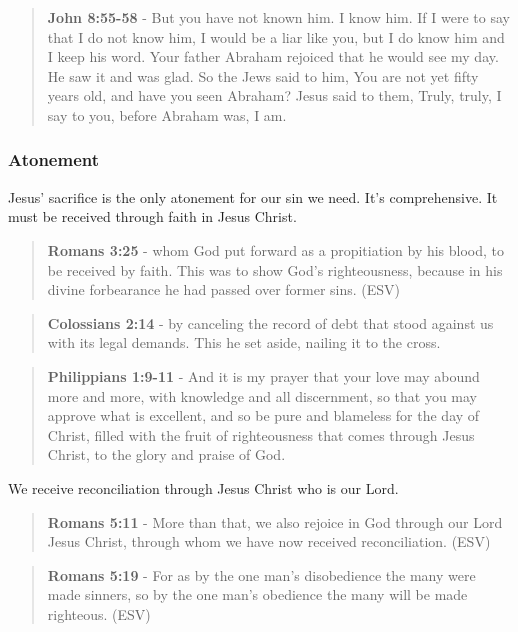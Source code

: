 \documentclass[11pt]{article}
\begin{document}
\begin{quote}
\textbf{John 8:55-58} - But you have not known him. I know him. If I were to say that I do not know him, I would be a liar like you, but I do know him and I keep his word. Your father Abraham rejoiced that he would see my day. He saw it and was glad. So the Jews said to him, You are not yet fifty years old, and have you seen Abraham? Jesus said to them, Truly, truly, I say to you, before Abraham was, I am.
\end{quote}

\subsubsection{Atonement}
\label{sec:orged750e9}
Jesus' sacrifice is the only atonement for our sin we need. It's comprehensive.
It must be received through faith in Jesus Christ.

\begin{quote}
\textbf{Romans 3:25} -  whom God put forward as a propitiation by his blood, to be received by faith.  This was to show God's righteousness, because in his divine forbearance he had passed over former sins.  (ESV)
\end{quote}

\begin{quote}
\textbf{Colossians 2:14} - by canceling the record of debt that stood against us with its legal demands. This he set aside, nailing it to the cross.
\end{quote}

\begin{quote}
\textbf{Philippians 1:9-11} - And it is my prayer that your love may abound more and more, with knowledge and all discernment, so that you may approve what is excellent, and so be pure and blameless for the day of Christ, filled with the fruit of righteousness that comes through Jesus Christ, to the glory and praise of God.
\end{quote}

We receive reconciliation through Jesus Christ who is our Lord.

\begin{quote}
\textbf{Romans 5:11} - More than that, we also rejoice in God through our Lord Jesus Christ, through whom we have now received reconciliation. (ESV)
\end{quote}

\begin{quote}
\textbf{Romans 5:19} - For as by the one man's disobedience the many were made sinners, so by the one man's obedience the many will be made righteous. (ESV)
\end{quote}
\end{document}
